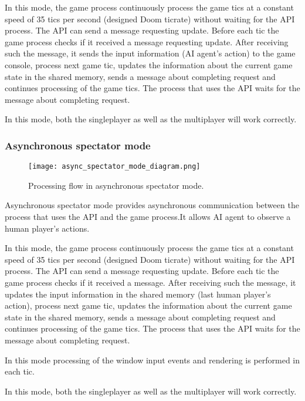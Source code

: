 	    In this mode, the game process continuously process the game tics at a constant speed of 35 tics per second (designed Doom ticrate) without waiting for the API process. The API can send a message requesting update. Before each tic the game process checks if it received a message requesting update. After receiving such the message, it sends the input information (AI agent's action) to the game console, process next game tic, updates the information about the current game state in the shared memory, sends a message about completing request and continues processing of the game tics. The process that uses the API waits for the message about completing request.
	    
	    In this mode, both the singleplayer as well as the multiplayer will work correctly.

    \subsubsection{Asynchronous spectator mode}\label{sec:architecture_async_spectator_mode}

	    \begin{figure}
			    \centering
			    \texttt{[image: async\_spectator\_mode\_diagram.png]}
			    \caption{Processing flow in asynchronous spectator mode.}\label{fig:async_spectator_mode_diagram}
	    \end{figure}
	    
	    Asynchronous spectator mode provides asynchronous communication between the process that uses the API and the game process.It allows AI agent to observe a human player's actions. 
	    
	    In this mode, the game process continuously process the game tics at a constant speed of 35 tics per second (designed Doom ticrate) without waiting for the API process. The API can send a message requesting update. Before each tic the game process checks if it received a message. After receiving such the message, it updates the input information in the shared memory (last human player's action), process next game tic, updates the information about the current game state in the shared memory, sends a message about completing request and continues processing of the game tics. The process that uses the API waits for the message about completing request.

        In this mode processing of the window input events and rendering is performed in each tic.
        
        In this mode, both the singleplayer as well as the multiplayer will work correctly.

